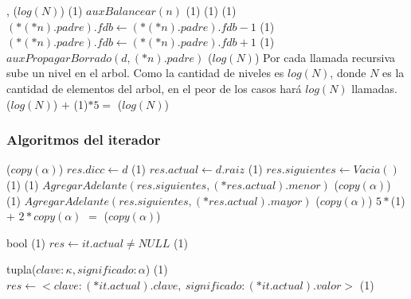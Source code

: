 {   ,
    }
{}
{\bigo($log(N)$)}
{                             \comment \bigo(1)
        \State $auxBalancear(n)$                                        \comment \bigo(1)
    \EndIf
                                           \comment \bigo(1)
                                        \comment \bigo(1)
            \State $(*(*n).padre).fdb \gets (*(*n).padre).fdb - 1$      \comment \bigo(1)
        \Else
            \State $(*(*n).padre).fdb \gets (*(*n).padre).fdb + 1$      \comment \bigo(1)
        \EndIf
        \State $auxPropagarBorrado(d, (*n).padre)$                      \comment \bigo($log(N)$)
    \EndIf
}
{   Por cada llamada recursiva sube un nivel en el arbol. Como la cantidad de niveles es
    $log(N)$, donde $N$ es la cantidad de elementos del arbol, en el peor de los casos
    hará $log(N)$ llamadas. \\
    \hspace*{8em} \bigo($log(N)$) $+$ \bigo(1)$*5 =$ \bigo($log(N)$) }


\subsubsection{Algoritmos del iterador}

{   }
{}
{\bigo($copy(\alpha)$)}
{   \State $res.dicc \gets d$                                           \comment \bigo(1)
    \State $res.actual \gets d.raiz$                                    \comment \bigo(1)
    \State $res.siguientes \gets Vacia()$                               \comment \bigo(1)
                                   \comment \bigo(1)
        \State $AgregarAdelante(res.siguientes, (*res.actual).menor)$   \comment \bigo($copy(\alpha)$)
    \EndIf
                                   \comment \bigo(1)
        \State $AgregarAdelante(res.siguientes, (*res.actual).mayor)$   \comment \bigo($copy(\alpha)$)
    \EndIf 
}
{   $5*$\bigo(1) + $2 * copy(\alpha)$ $=$ \bigo($copy(\alpha)$)}

{   }
{bool}
{\bigo(1)}
{   \State $res \gets it.actual \neq NULL$      \comment \bigo(1)
}
{}

{   }
{tupla($clave: \kappa, significado: \alpha$)}
{\bigo(1)}
{   \State $res \gets <clave: (*it.actual).clave,\ significado: (*it.actual).valor>$      \comment \bigo(1)
}
{}

